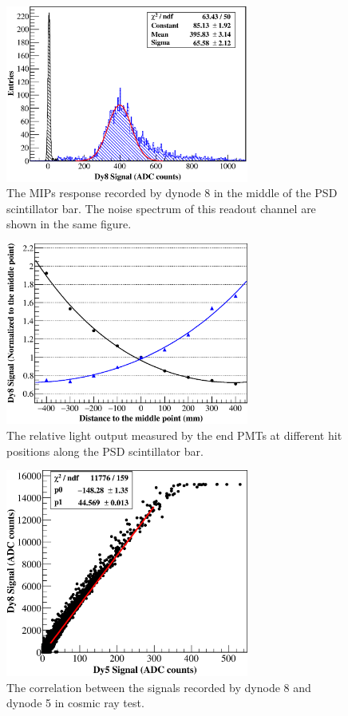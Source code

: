 \documentclass[preprint, times]{elsarticle}
\begin{document}
\begin{figure}[h]
	\centering
	\includegraphics[width=80mm]{mip}
	\caption{The MIPs response recorded by dynode 8 in the middle of the PSD scintillator bar. The noise spectrum of this readout channel are shown in the same figure.}
	\label{fig:mip}
\end{figure}

\begin{figure}[h]
	\centering
	\includegraphics[width=80mm]{attenuation}
	\caption{The relative light output measured by the end PMTs at different hit positions along the PSD scintillator bar.}
	\label{fig:attenuation}
\end{figure}

\begin{figure}[h]
	\centering
	\includegraphics[width=80mm]{dy58}
	\caption{The correlation between the signals recorded by dynode 8 and dynode 5 in cosmic ray test.}
	\label{fig:dy58}
\end{figure}
\end{document}

